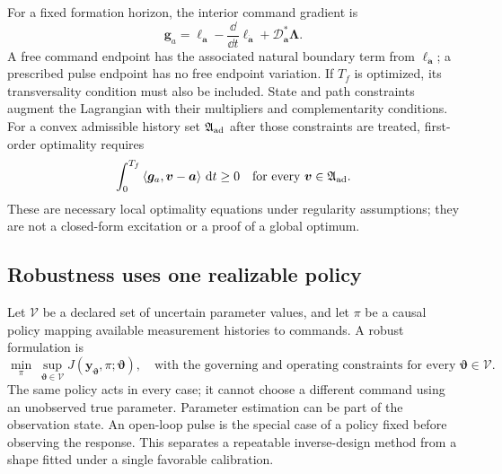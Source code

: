 For a fixed formation horizon, the interior command gradient is
\begin{equation}
 \bm g_a=\ell_{\bm a}
       -\frac{\dd}{\dd t}\ell_{\dot{\bm a}}
       +\mathcal D_{\bm a}^{\ast}\bm\Lambda.
 \label{eq:control-gradient}
\end{equation}
A free command endpoint has the associated natural boundary term from
$\ell_{\dot{\bm a}}$; a prescribed pulse endpoint has no free endpoint
variation. If $T_f$ is optimized, its transversality condition must also be
included. State and path constraints augment the Lagrangian with their
multipliers and complementarity conditions. For a convex admissible history
set $\mathfrak A_{\rm ad}$ after those constraints are treated, first-order optimality
requires
\begin{equation}
 \int_0^{T_f}\left\langle\bm g_a,\bm v-\bm a\right\rangle\,\mathrm d t\geq0
       \quad\text{for every }\bm v\in\mathfrak A_{\rm ad}.
 \label{eq:control-variational-inequality}
\end{equation}
These are necessary local optimality equations under regularity assumptions;
they are not a closed-form excitation or a proof of a global optimum.

\subsection{Robustness uses one realizable policy}
Let $\mathcal V$ be a declared set of uncertain parameter values, and let
$\pi$ be a causal policy mapping available measurement histories to commands.
A robust formulation is
\begin{equation}
 \min_\pi\ \sup_{\bm\vartheta\in\mathcal V}
       J(\bm y_{\bm\vartheta},\pi;\bm\vartheta),
 \quad\text{with the governing and operating constraints for every }
 \bm\vartheta\in\mathcal V.
 \label{eq:robust-design}
\end{equation}
The same policy acts in every case; it cannot choose a different command using
an unobserved true parameter. Parameter estimation can be part of the
observation state. An open-loop pulse is the special case of a policy fixed
before observing the response. This separates a repeatable inverse-design
method from a shape fitted under a single favorable calibration.

